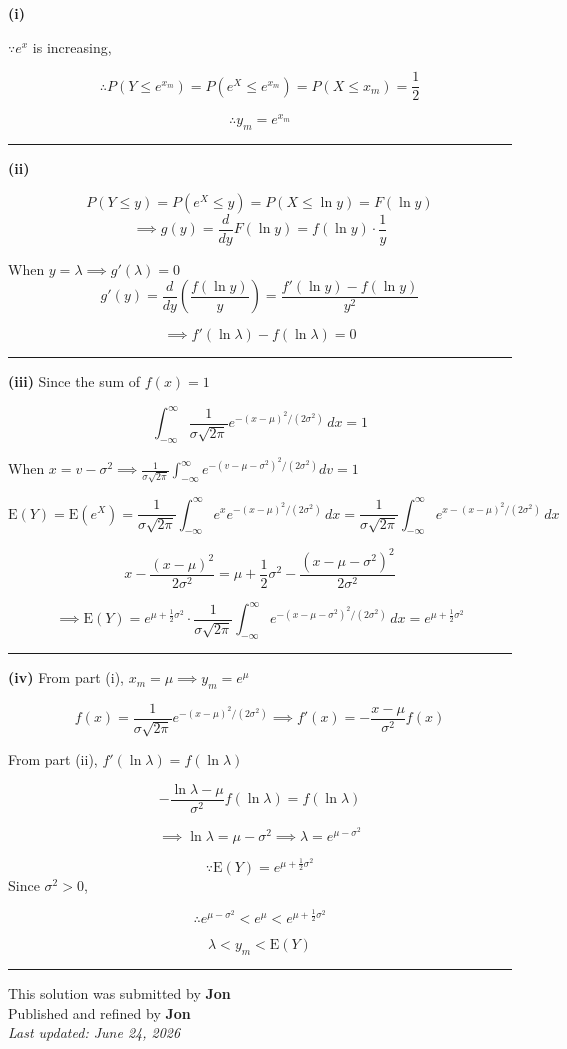 \documentclass[12pt]{article}
\begin{document}
\newcommand{\ds}{\displaystyle}

\textbf{(i)}

$\because e^x$ is increasing,

$$\therefore P(Y\leq e^{x_m})=P(e^X\leq e^{x_m})=P(X\leq x_m)=\frac12$$

$$\therefore \boxed{y_m=e^{x_m}}$$

\bigskip\hrule\bigskip

\textbf{(ii)}

$$P(Y\leq y)=P(e^X\leq y)=P(X\leq \ln y)=F(\ln y)$$
$$\implies g(y)=\frac{d}{dy}F(\ln y)=f(\ln y)\cdot\frac1y$$

When $y=\lambda\implies g'(\lambda)=0$
$$g'(y)=\frac{d}{dy}\left(\frac{f(\ln y)}{y}\right)=\frac{f'(\ln y)-f(\ln y)}{y^2}$$

$$\implies f'(\ln\lambda)-f(\ln\lambda)=0$$

\bigskip\hrule\bigskip

\textbf{(iii)} Since the sum of $f(x) = 1$

$$\int^\infty_{-\infty} \frac{1}{\sigma\sqrt{2\pi}}e^{-(x-\mu)^2/(2\sigma^2)}\,dx=1$$

When $x=v-\sigma^2\ds\implies \frac{1}{\sigma\sqrt{2\pi}}\int_{-\infty}^{\infty}e^{-(v-\mu-\sigma^2)^2/(2\sigma^2)}dv=1$

$$\mathrm{E}(Y)=\mathrm{E}(e^X)=\frac{1}{\sigma\sqrt{2\pi}}\int_{-\infty}^{\infty}e^x e^{-(x-\mu)^2/(2\sigma^2)}\,dx=\frac{1}{\sigma\sqrt{2\pi}}\int_{-\infty}^{\infty}e^{x-(x-\mu)^2/(2\sigma^2)}\,dx$$


$$x-\frac{(x-\mu)^2}{2\sigma^2}
=\mu+\frac12\sigma^2-\frac{(x-\mu-\sigma^2)^2}{2\sigma^2}$$

$$\implies\mathrm{E}(Y)=e^{\mu+\frac12\sigma^2}
\cdot\frac{1}{\sigma\sqrt{2\pi}}\int_{-\infty}^{\infty}e^{-(x-\mu-\sigma^2)^2/(2\sigma^2)}\,dx=\boxed{e^{\mu+\frac12\sigma^2}}$$

\bigskip\hrule\bigskip

\textbf{(iv)} From part (i), $\ds x_m=\mu \implies y_m=e^\mu$

$$f(x)=\frac{1}{\sigma\sqrt{2\pi}}e^{-(x-\mu)^2/(2\sigma^2)} \implies f'(x)=-\frac{x-\mu}{\sigma^2}f(x)$$

From part (ii), $\ds f'(\ln\lambda)=f(\ln\lambda)$

$$-\frac{\ln\lambda-\mu}{\sigma^2}f(\ln\lambda)=f(\ln\lambda)$$

$$\implies \ln\lambda=\mu-\sigma^2 \implies \lambda=e^{\mu-\sigma^2}$$

$$\because \mathrm{E}(Y)=e^{\mu+\frac12\sigma^2}$$
Since $\sigma^2>0$,

$$\therefore e^{\mu-\sigma^2}<e^\mu<e^{\mu+\frac12\sigma^2}$$

$$\boxed{\lambda<y_m<\mathrm{E}(Y)}$$

\bigskip
\hrule
\begin{center}
This solution was submitted by \textbf{Jon}\\[4pt]
Published and refined by \textbf{Jon}\\[8pt]
\textit{Last updated: June 24, 2026}
\end{center}
\end{document}
